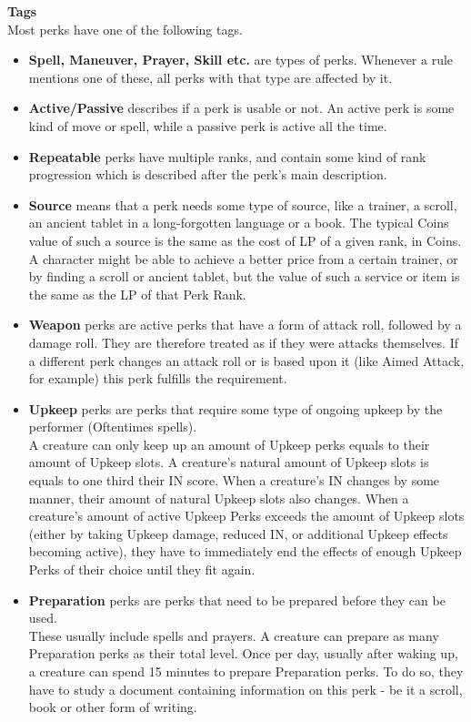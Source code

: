 \textbf{Tags}\\
Most perks have one of the following tags.\\
\begin{itemize}
	\item \textbf{Spell, Maneuver, Prayer, Skill etc.} are types of perks.
	 Whenever a rule mentions one of these, all perks with that type are affected by it.\\
	\item \textbf{Active/Passive} describes if a perk is usable or not.
	An active perk is some kind of move or spell, while a passive perk is active all the time.\\
	\item \textbf{Repeatable} perks have multiple ranks, and contain some kind of rank progression which is described after the perk's main description.\\
	\item \textbf{Source} means that a perk needs some type of source, like a trainer, a scroll, an ancient tablet in a long-forgotten language or a book.
	The typical Coins value of such a source is the same as the cost of LP of a given rank, in Coins.\\
	A character might be able to achieve a better price from a certain trainer, or by finding a scroll or ancient tablet, but the value of such a service or item is the same as the LP of that Perk Rank.\\
	\item \textbf{Weapon} perks are active perks that have a form of attack roll, followed by a damage roll.
	They are therefore treated as if they were attacks themselves.
	If a different perk changes an attack roll or is based upon it (like Aimed Attack, for example) this perk fulfills the requirement.\\
	\item \textbf{Upkeep} perks are perks that require some type of ongoing upkeep by the performer (Oftentimes spells).\\
	A creature can only keep up an amount of Upkeep perks equals to their amount of Upkeep slots.
	A creature's natural amount of Upkeep slots is equals to one third their IN score.
	When a creature's IN changes by some manner, their amount of natural Upkeep slots also changes.
	When a creature's amount of active Upkeep Perks exceeds the amount of Upkeep slots (either by taking Upkeep damage, reduced IN, or additional Upkeep effects becoming active), they have to immediately end the effects of enough Upkeep Perks of their choice until they fit again.
	\item \textbf{Preparation} perks are perks that need to be prepared before they can be used.\\
	These usually include spells and prayers.
	A creature can prepare as many Preparation perks as their total level.
	Once per day, usually after waking up, a creature can spend 15 minutes to prepare Preparation perks.
	To do so, they have to study a document containing information on this perk - be it a scroll, book or other form of writing.
\end{itemize}

